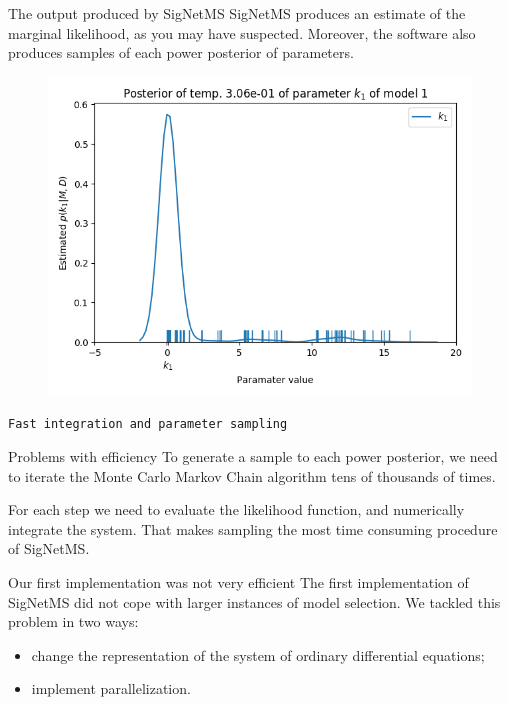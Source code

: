 \documentclass{beamer}
\begin{document}
\begin{frame}{The output produced by SigNetMS}
SigNetMS produces an estimate of the marginal likelihood, as you may
have suspected. \pause Moreover, the software also produces samples of
each power posterior of parameters.
\pause
\begin{figure}
\centering
\includegraphics[clip=true,width=.65\linewidth]{experiments/results/girolami/gamma/snm/model1_29_p0_k_1.png}
\end{figure}
\end{frame}

\begin{frame}{}
\begin{center}
    \texttt{Fast integration and parameter sampling}
\end{center}
\end{frame}


\begin{frame}{Problems with efficiency}
To generate a sample to each power posterior, we need to iterate the
Monte Carlo Markov Chain algorithm tens of thousands of times. \pause

For each step we need to evaluate the likelihood function, and 
\alert{numerically integrate the system}. \pause That makes sampling the
most time consuming procedure of SigNetMS.
\end{frame}

\begin{frame}{Our first implementation was not very efficient}
The first implementation of SigNetMS did not cope with larger instances
of model selection. \pause We tackled this problem in two ways:
\begin{itemize}
    \item{change the representation of the system of ordinary
        differential equations;}
    \item{implement parallelization.}
\end{itemize}
\end{frame}
\end{document}
